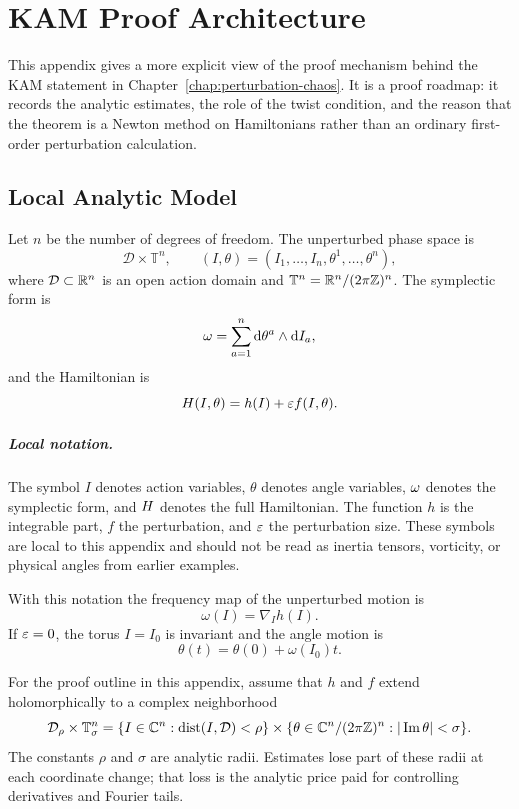 \chapter{KAM Proof Architecture}
\label{app:kam-proof-architecture}

This appendix gives a more explicit view of the proof mechanism behind the KAM
statement in Chapter~\ref{chap:perturbation-chaos}.  It is a proof roadmap:
it records the analytic estimates, the role of the twist condition, and the
reason that the theorem is a Newton method on Hamiltonians rather than an
ordinary first-order perturbation calculation.

\section{Local Analytic Model}
\label{sec:kam-local-analytic-model}

Let \(n\) be the number of degrees of freedom.  The unperturbed phase space is
\[
        \mathcal{D}\times \mathbb{T}^n,\qquad
        (I,\theta)=(I_1,\dots,I_n,\theta^1,\dots,\theta^n),
\]
where \(\mathcal{D}\subset \mathbb{R}^n\) is an open action domain and
\(\mathbb{T}^n=\mathbb{R}^n/(2\pi\mathbb{Z})^n\).  The symplectic form is
\[
        \omega=\sum_{a=1}^n \mathrm{d} \theta^a\wedge \mathrm{d} I_a,
\]
and the Hamiltonian is
\[
        H(I,\theta)=h(I)+\varepsilon f(I,\theta).
\]

\paragraph{Local notation.}
The symbol \(I\) denotes action variables, \(\theta\) denotes angle variables,
\(\omega\) denotes the symplectic form, and \(H\) denotes the full Hamiltonian.
The function \(h\) is the integrable part, \(f\) the perturbation, and
\(\varepsilon\) the perturbation size.  These symbols are local to this appendix and
should not be read as inertia tensors, vorticity, or physical angles from
earlier examples.

With this notation the frequency map of the unperturbed motion is
\[
        \omega(I)=\nabla_I h(I).
\]
If \(\varepsilon=0\), the torus \(I=I_0\) is invariant and the angle motion is
\[
        \theta(t)=\theta(0)+\omega(I_0)t .
\]

\begin{hypothesis}
For the proof outline in this appendix, assume that \(h\) and \(f\) extend
holomorphically to a complex neighborhood
\[
        \mathcal{D}_\rho\times \mathbb{T}^n_\sigma
        =
        \{I\in\mathbb{C}^n:\operatorname{dist}(I,\mathcal{D})<\rho\}
        \times
        \{\theta\in\mathbb{C}^n/(2\pi\mathbb{Z})^n:|\operatorname{Im}\theta|<\sigma\}.
\]
The constants \(\rho\) and \(\sigma\) are analytic radii.  Estimates lose part
of these radii at each coordinate change; that loss is the analytic price paid
for controlling derivatives and Fourier tails.
\end{hypothesis}

